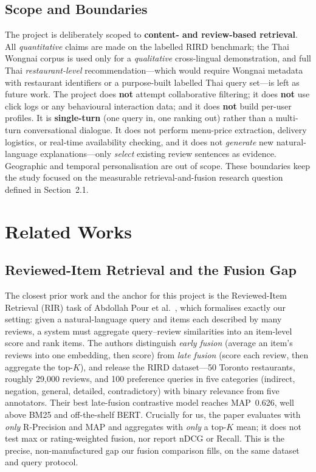 \subsection{Scope and Boundaries}
\label{sec:scope}
The project is deliberately scoped to \textbf{content- and review-based retrieval}. All
\emph{quantitative} claims are made on the labelled RIRD benchmark; the Thai Wongnai
corpus is used only for a \emph{qualitative} cross-lingual demonstration, and full Thai
\emph{restaurant-level} recommendation---which would require Wongnai metadata with
restaurant identifiers or a purpose-built labelled Thai query set---is left as future
work. The project does \textbf{not} attempt collaborative filtering; it does \textbf{not}
use click logs or any behavioural interaction data; and it does \textbf{not} build
per-user profiles. It is \textbf{single-turn} (one query in, one ranking out) rather
than a multi-turn conversational dialogue. It does not perform menu-price extraction,
delivery logistics, or real-time availability checking, and it does not \emph{generate}
new natural-language explanations---only \emph{select} existing review sentences as
evidence. Geographic and temporal personalisation are out of scope. These boundaries
keep the study focused on the measurable retrieval-and-fusion research question defined
in Section~2.1.

\section{Related Works}

\subsection{Reviewed-Item Retrieval and the Fusion Gap}
The closest prior work and the anchor for this project is the Reviewed-Item Retrieval
(RIR) task of Abdollah Pour et al.~\cite{rird2023}, which formalises exactly our
setting: given a natural-language query and items each described by many reviews, a
system must aggregate query--review similarities into an item-level score and rank
items. The authors distinguish \emph{early fusion} (average an item's reviews into one
embedding, then score) from \emph{late fusion} (score each review, then aggregate the
top-$K$), and release the RIRD dataset---50 Toronto restaurants, roughly 29{,}000
reviews, and 100 preference queries in five categories (indirect, negation, general,
detailed, contradictory) with binary relevance from five annotators. Their best
late-fusion contrastive model reaches MAP~0.626, well above BM25 and off-the-shelf
BERT. Crucially for us, the paper evaluates with \emph{only} R-Precision and MAP and
aggregates with \emph{only} a top-$K$ mean; it does not test max or rating-weighted
fusion, nor report nDCG or Recall. This is the precise, non-manufactured gap our fusion
comparison fills, on the same dataset and query protocol.

